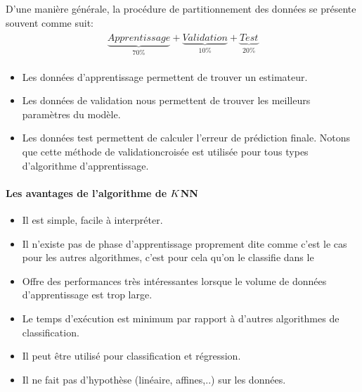 \documentclass[letterpaper,11pt,english]{sphinxmanual}
\begin{document}
\sphinxAtStartPar
D’une manière générale, la procédure de partitionnement des données se
présente souvent comme suit:
\begin{equation}\label{equation:chapter3:chapter3:24}
\begin{split}\begin{aligned}
    \underbrace{Apprentissage }_{70\%} +
    \underbrace{Validation}_{10\%}+
    \underbrace{Test}_{20\%}\end{aligned}\end{split}
\end{equation}\begin{itemize}
\item {} 
\sphinxAtStartPar
Les données d’apprentissage permettent de trouver un estimateur.

\item {} 
\sphinxAtStartPar
Les données de validation nous permettent de trouver les meilleurs
paramètres du modèle.

\item {} 
\sphinxAtStartPar
Les données test permettent de calculer l’erreur de prédiction
finale. Notons que cette méthode de validation\sphinxhyphen{}croisée est utilisée
pour tous types d’algorithme d’apprentissage.

\end{itemize}


\paragraph{Les avantages de l’algorithme de \protect\(K\protect\)\sphinxhyphen{}NN}
\label{\detokenize{chapter3:les-avantages-de-lalgorithme-de-k-nn}}\begin{itemize}
\item {} 
\sphinxAtStartPar
Il est simple, facile à interpréter.

\item {} 
\sphinxAtStartPar
Il n’existe pas de phase d’apprentissage proprement dite comme c’est
le cas pour les autres algorithmes, c’est pour cela qu’on le
classifie dans le 

\item {} 
\sphinxAtStartPar
Offre des performances très intéressantes lorsque le volume de
données d’apprentissage est trop large.

\item {} 
\sphinxAtStartPar
Le temps d’exécution est minimum par rapport à d’autres algorithmes
de classification.

\item {} 
\sphinxAtStartPar
Il peut être utilisé pour classification et régression.

\item {} 
\sphinxAtStartPar
Il ne fait pas d’hypothèse (linéaire, affines,..) sur les données.

\end{itemize}
\end{document}
